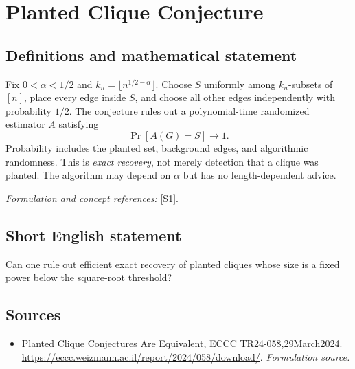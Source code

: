 \documentclass[11pt]{article}
\begin{document}
\section*{\texorpdfstring{Planted Clique Conjecture}{Planted Clique Conjecture}}\label{30006743}
\subsection{Definitions and mathematical statement}
Fix $0<\alpha<1/2$ and $k_n=\lfloor n^{1/2-\alpha}\rfloor$. Choose $S$ uniformly among $k_n$-subsets of $[n]$, place every edge inside $S$, and choose all other edges independently with probability $1/2$. The conjecture rules out a polynomial-time randomized estimator $A$ satisfying
\[
 \Pr[A(G)=S]\longrightarrow1.
\]
Probability includes the planted set, background edges, and algorithmic randomness. This is \emph{exact recovery}, not merely detection that a clique was planted. The algorithm may depend on $\alpha$ but has no length-dependent advice.
\par\smallskip\textit{Formulation and concept references:} \href{https://eccc.weizmann.ac.il/report/2024/058/download/}{[S1]}.

\subsection{Short English statement}
Can one rule out efficient exact recovery of planted cliques whose size is a fixed power below the square-root threshold?
\subsection{Sources}
\begin{itemize}
\item[S1]Planted Clique Conjectures Are Equivalent, ECCC TR24-058,29March2024.
\url{https://eccc.weizmann.ac.il/report/2024/058/download/}.
\textit{Formulation source.}
\end{itemize}
\end{document}
